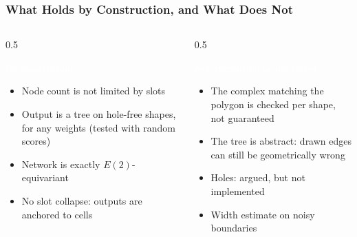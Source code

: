 \begin{frame}[fragile]\frametitle{What Holds by Construction, and What Does Not}
\begin{columns}[t]
  \begin{column}[T]{0.5\linewidth}
  \begin{block}{\textcolor{white}{By construction}}
    \begin{itemize}
    \item[\tiny$\blacktriangleright$] Node count is not limited by slots
    \item[\tiny$\blacktriangleright$] Output is a tree on hole-free shapes, for any weights (tested with random scores)
    \item[\tiny$\blacktriangleright$] Network is exactly $E(2)$-equivariant
    \item[\tiny$\blacktriangleright$] No slot collapse: outputs are anchored to cells
    \end{itemize}
  \end{block}
  \end{column}
  \begin{column}[T]{0.5\linewidth}
  \begin{alertblock}{\textcolor{white}{Not guaranteed or not tested}}
    \begin{itemize}
    \item[\tiny$\blacktriangleright$] The complex matching the polygon is checked per shape, not guaranteed
    \item[\tiny$\blacktriangleright$] The tree is abstract: drawn edges can still be geometrically wrong
    \item[\tiny$\blacktriangleright$] Holes: argued, but not implemented
    \item[\tiny$\blacktriangleright$] Width estimate on noisy boundaries
    \end{itemize}
  \end{alertblock}
  \end{column}
\end{columns}
\end{frame}

